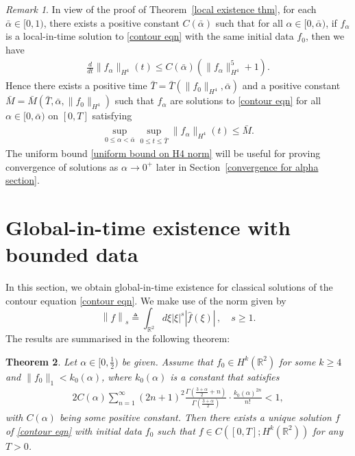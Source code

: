 \documentclass[reqno]{amsart}%
\newtheorem{thm}{Theorem}[section]
\theoremstyle{definition}
\theoremstyle{remark}
\newtheorem{rem}[thm]{Remark}
\numberwithin{equation}{section}
\newcommand{\0}{\mathbf{0}}
\newcommand{\1}{\mathbf{1}}
\newcommand{\R}{\mathbb R}
\numberwithin{equation}{section}
\numberwithin{theorem}{section}
\numberwithin{figure}{section}
\begin{document}
\begin{rem}\label{uniform bound remark}
In view of the proof of Theorem~\ref{local existence thm}, for each $\bar{\alpha}\in[0,1)$, there exists a positive constant $C(\bar{\alpha})$ such that for all $\alpha\in[0,\bar{\alpha})$, if $f_\alpha$ is a local-in-time solution to \eqref{contour eqn} with the same initial data $f_0$, then we have
\begin{align*}
\frac{d}{dt}\|f_\alpha\|_{H^4}(t)\le C(\bar{\alpha})(\|f_\alpha\|_{H^4}^5+1).
\end{align*}
Hence there exists a positive time $\bar{T}=\bar{T}(\|f_0\|_{H^4},\bar\alpha)$ and a positive constant $\bar{M}=\bar{M}(\bar{T},\bar{\alpha},\|f_0\|_{H^4})$ such that $f_\alpha$ are solutions to \eqref{contour eqn} for all $\alpha\in[0,\bar{\alpha})$ on $[0,T]$ satisfying
\begin{align}\label{uniform bound on H4 norm}
\sup_{0\le \alpha<\bar{\alpha}}\sup_{0\le t\le \bar{T}}\|f_\alpha\|_{H^4}(t)\le \bar{M}.
\end{align}
The uniform bound \eqref{uniform bound on H4 norm} will be useful for proving convergence of solutions as $\alpha\to0^+$ later in Section~\ref{convergence for alpha section}.
\end{rem}


\section{Global-in-time existence with bounded data}\label{global-in-time existence sec}

In this section, we obtain global-in-time existence for classical solutions of the contour equation \eqref{contour eqn}. We make use of the norm given by
\begin{equation}\label{def of fourier norm}
\left\|f\right\|_{s} \triangleq \int_{\mathbb{R}^2} d\xi |\xi|^{s} |\hat{f}(\xi)| \,  , \quad s \geq 1.
\end{equation}
The results are summarised in the following theorem:

\begin{thm}\label{global existence thm}
Let $\alpha\in[0,\frac{1}{2})$ be given. Assume that $f_0\in H^k(\R^2)$ for some $k\ge4$ and $\|f_0\|_{1}<k_0(\alpha)$, where $k_0(\alpha)$ is a constant that satisfies
\begin{align}\label{condition on k0}
2 C(\alpha) \sum_{n=1}^{\infty}   \left( 2n+1 \right)^{2}\frac{\Gamma\left(\frac{3 + \alpha}{2} + n\right)}{\Gamma\left(\frac{3 + \alpha}{2}\right)} \cdot \frac{k_0(\alpha)^{2n}}{n!}<1,
\end{align}
with $C(\alpha)$ being some positive constant. Then there exists a unique solution $f$ of \eqref{contour eqn} with initial data $f_0$ such that $f\in C([0,T]; H^k(\R^2))$ for any $T>0$.
\end{thm}
\end{document}
